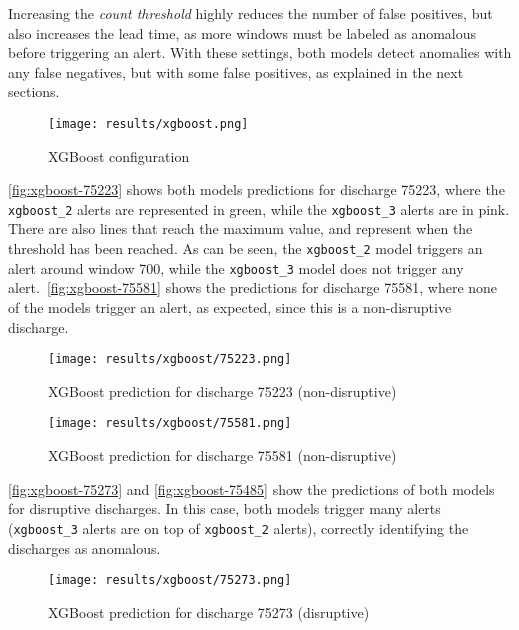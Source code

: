 Increasing the \textit{count threshold} highly reduces the number of false positives, but also increases the lead time, as more windows must be labeled as anomalous before triggering an alert. With these settings, both models detect anomalies with any false negatives, but with some false positives, as explained in the next sections.

\begin{figure}[H]
    \centering
    \texttt{[image: results/xgboost.png]}
    \caption{XGBoost configuration}
    \label{fig:xgboost-config}
\end{figure}

\autoref{fig:xgboost-75223} shows both models predictions for discharge 75223, where the \texttt{xgboost\_2} alerts are represented in green, while the \texttt{xgboost\_3} alerts are in pink. There are also lines that reach the maximum value, and represent when the threshold has been reached. As can be seen, the \texttt{xgboost\_2} model triggers an alert around window 700, while the \texttt{xgboost\_3} model does not trigger any alert.\ \autoref{fig:xgboost-75581} shows the predictions for discharge 75581, where none of the models trigger an alert, as expected, since this is a non-disruptive discharge.

\begin{figure}[H]
    \centering
    \texttt{[image: results/xgboost/75223.png]}
    \caption{XGBoost prediction for discharge 75223 (non-disruptive)}
    \label{fig:xgboost-75223}
\end{figure}

\begin{figure}[H]
    \centering
    \texttt{[image: results/xgboost/75581.png]}
    \caption{XGBoost prediction for discharge 75581 (non-disruptive)}
    \label{fig:xgboost-75581}
\end{figure}

\autoref{fig:xgboost-75273} and \autoref{fig:xgboost-75485} show the predictions of both models for disruptive discharges. In this case, both models trigger many alerts (\texttt{xgboost\_3} alerts are on top of \texttt{xgboost\_2} alerts), correctly identifying the discharges as anomalous.

\begin{figure}[H]
    \centering
    \texttt{[image: results/xgboost/75273.png]}
    \caption{XGBoost prediction for discharge 75273 (disruptive)}
    \label{fig:xgboost-75273}
\end{figure}

